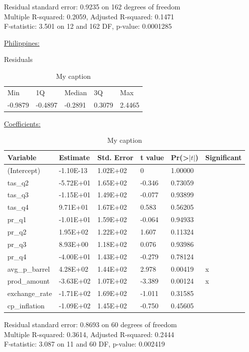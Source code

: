 \documentclass[12pt,a4paper,english]{article}
\begin{document}
Residual standard error: 0.9235 on 162 degrees of freedom\\
Multiple R-squared:  0.2059, Adjusted R-squared:  0.1471 \\
F-statistic: 3.501 on 12 and 162 DF,  p-value: 0.0001285


\begin{center} \underline{Philippines:} \\ \end{center}
Residuals
\FloatBarrier
\begin{table}[!htbp]
\label{my-label}
\begin{tabular}{lllll}
Min     & 1Q      & Median  & 3Q     & Max    \\
-0.9879 & -0.4897 & -0.2891 & 0.3079 & 2.4465
\end{tabular}
\centering
\caption{My caption}
\end{table}
\FloatBarrier

\underline{Coefficients:}
\FloatBarrier
\begin{table}[!htbp]
\centering
\begin{tabular}{llllll}
\hline
Variable       & Estimate  & Std. Error & t value & Pr(\textgreater$|t|$) & Significant \\ \hline
(Intercept)    & -1.10E-13 & 1.02E+02   & 0       & 1.00000             &             \\
tas\_q2        & -5.72E+01 & 1.65E+02   & -0.346  & 0.73059             &             \\
tas\_q3        & -1.15E+01 & 1.49E+02   & -0.077  & 0.93899             &             \\
tas\_q4        & 9.71E+01  & 1.67E+02   & 0.583   & 0.56205             &             \\
pr\_q1         & -1.01E+01 & 1.59E+02   & -0.064  & 0.94933             &             \\
pr\_q2         & 1.95E+02  & 1.22E+02   & 1.607   & 0.11324             &             \\
pr\_q3         & 8.93E+00  & 1.18E+02   & 0.076   & 0.93986             &             \\
pr\_q4         & -4.00E+01 & 1.43E+02   & -0.279  & 0.78124             &             \\
avg\_p\_barrel & 4.28E+02  & 1.44E+02   & 2.978   & 0.00419             & x           \\
prod\_amount   & -3.63E+02 & 1.07E+02   & -3.389  & 0.00124             & x           \\
exchange\_rate & -1.71E+02 & 1.69E+02   & -1.011  & 0.31585             &             \\
cp\_inflation  & -1.09E+02 & 1.45E+02   & -0.750  & 0.45605             &            \\ \hline
\end{tabular}
\caption{My caption}
\label{my-label}
\end{table}
\FloatBarrier
Residual standard error: 0.8693 on 60 degrees of freedom \\
Multiple R-squared:  0.3614,	Adjusted R-squared:  0.2444 \\ 
F-statistic: 3.087 on 11 and 60 DF,  p-value: 0.002419 \\
\end{document}
